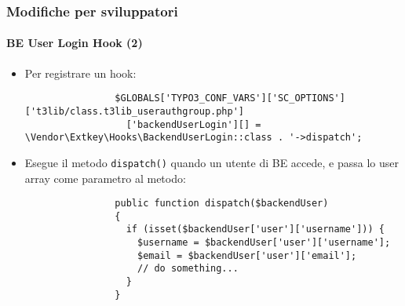 \begin{frame}[fragile]
	\frametitle{Modifiche per sviluppatori}
	\framesubtitle{BE User Login Hook (2)}

	\lstset{basicstyle=\tiny\ttfamily}

	\begin{itemize}
		\item Per registrare un hook:

			\begin{lstlisting}
				$GLOBALS['TYPO3_CONF_VARS']['SC_OPTIONS']['t3lib/class.t3lib_userauthgroup.php']
				  ['backendUserLogin'][] = \Vendor\Extkey\Hooks\BackendUserLogin::class . '->dispatch';
			\end{lstlisting}

		\item Esegue il metodo \texttt{dispatch()} quando un utente di BE accede, e passa
			lo user array come parametro al metodo:

			\begin{lstlisting}
				public function dispatch($backendUser)
				{
				  if (isset($backendUser['user']['username'])) {
				    $username = $backendUser['user']['username'];
				    $email = $backendUser['user']['email'];
				    // do something...
				  }
				}
			\end{lstlisting}

	\end{itemize}

\end{frame}

